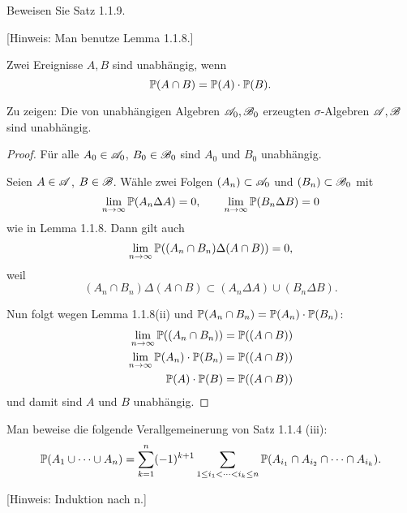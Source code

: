\begin{aufg}
  Beweisen Sie Satz 1.1.9.

  [Hinweis: Man benutze Lemma 1.1.8.]
\end{aufg}

Zwei Ereignisse $A,B$ sind unabhängig, wenn
\[ \mathbb{P}(A \cap B) = \mathbb{P}(A) \cdot \mathbb{P}(B). \]

Zu zeigen: Die von unabhängigen Algebren $\mathscr{A}_0, \mathscr{B}_0$ erzeugten
$\sigma$-Algebren $\mathscr{A}, \mathscr{B}$ sind unabhängig.

\begin{proof}
  Für alle $A_0 \in \mathscr{A}_0$, $B_0 \in \mathscr{B}_0$ sind $A_0$ und $B_0$ unabhängig.

  Seien $A \in \mathscr{A}$, $B \in \mathscr{B}$. Wähle zwei Folgen $(A_n) \subset \mathscr{A}_0$ und
  $(B_n) \subset \mathscr{B}_0$ mit
  \[ \lim_{n \to \infty} \mathbb{P}( A_n \Delta A) = 0, \qquad \lim_{n \to \infty} \mathbb{P}(
    B_n \Delta B) = 0 \]
  wie in Lemma 1.1.8. Dann gilt auch
  \[ \lim_{n \to \infty} \mathbb{P}( (A_n \cap B_n) \Delta (A \cap B)) = 0, \]
  weil
  \[ (A_n \cap B_n) \Delta (A \cap B) \subset (A_n \Delta A) \cup (B_n \Delta B). \]

  Nun folgt wegen Lemma 1.1.8(ii) und $\mathbb{P}(A_n \cap B_n) = \mathbb{P}(A_n) \cdot \mathbb{P}(B_n)$:
  \[ \begin{aligned}
      \lim_{n \to \infty} \mathbb{P}( (A_n \cap B_n) ) &= \mathbb{P} ( (A \cap B ) ) \\
      \lim_{n \to \infty} \mathbb{P}(A_n) \cdot \mathbb{P}(B_n) &= \mathbb{P} ( (A \cap B ) ) \\
      \mathbb{P}(A) \cdot \mathbb{P}(B) &= \mathbb{P} ( (A \cap B ) )
    \end{aligned} \]
  und damit sind $A$ und $B$ unabhängig.
\end{proof}

\begin{aufg}[Poincaré]
  Man beweise die folgende Verallgemeinerung von Satz 1.1.4 (iii):
  \[ \mathbb{P}( A_1 \cup \cdots \cup A_n ) = \sum_{k=1}^n (-1)^{k+1} \sum_{1 \le i_1 <
      \cdots < i_k \le n} \mathbb{P}( A_{i_1} \cap A_{i_2} \cap \cdots \cap
    A_{i_k}). \]
  
  [Hinweis: Induktion nach n.]
\end{aufg}

